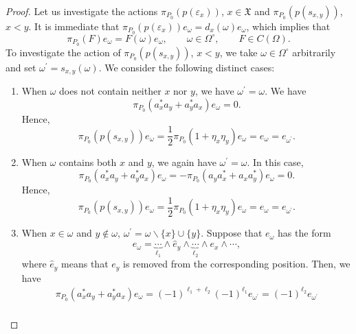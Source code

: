 \documentclass[pdftex]{sigma}
\numberwithin{equation}{section}
\newcommand{\pr}[1]{#1^{\prime}}
\newcommand{\mfrak}[1]{\mathfrak{#1}}
\begin{document}
\begin{proof}
Let us investigate the actions $\pi_{P_{0}}(p(\varepsilon_{x}))$, $x\in\mfrak{X}$ and $\pi_{P_{0}}(p(s_{x,y}))$, $x<y$. It is immediate that
$\pi_{P_{0}}(p(\varepsilon_{x}))e_{\omega}=d_{x}(\omega) e_{\omega}$,
which implies that
\begin{equation*}
	\pi_{P_{0}}(F)e_{\omega}=F(\omega) e_{\omega},\qquad \omega\in \Omega^{\circ},\qquad F\in C(\Omega).
\end{equation*}
To investigate the action of $\pi_{P_{0}}(p(s_{x,y}))$, $x<y$, we take $\omega\in \Omega^{\circ}$ arbitrarily and set $\pr{\omega}=s_{x,y}(\omega)$.
We consider the following distinct cases:
\begin{enumerate}\itemsep=0pt\samepage
\item 	When $\omega$ does not contain neither $x$ nor $y$, we have $\pr{\omega}=\omega$.
We have
				\begin{equation*}
					\pi_{P_{0}}(a_{x}^{\ast}a_{y}+a_{y}^{\ast}a_{x})e_{\omega}=0.
				\end{equation*}
				Hence,
				\begin{equation*}
\pi_{P_{0}}(p(s_{x,y}))e_{\omega}=\frac{1}{2}\pi_{P_{0}}(1+\eta_{x}\eta_{y})e_{\omega}=e_{\omega}=e_{\pr{\omega}}.
				\end{equation*}
\item 	When $\omega$ contains both $x$ and $y$, we again have $\pr{\omega}=\omega$. In this case,
				\begin{equation*}
\pi_{P_{0}}(a_{x}^{\ast}a_{y}+a_{y}^{\ast}a_{x})e_{\omega}=-\pi_{P_{0}}(a_{y}a_{x}^{\ast}+a_{x}a_{y}^{\ast})e_{\omega}=0.
				\end{equation*}
				Hence,
				\begin{equation*}
\pi_{P_{0}}(p(s_{x,y}))e_{\omega}=\frac{1}{2}\pi_{P_{0}}(1+\eta_{x}\eta_{y})e_{\omega}=e_{\omega}=e_{\pr{\omega}}.
				\end{equation*}
		\item 	When $x\in\omega$ and $y\not\in\omega$, $\pr{\omega}=\omega\backslash \{x\}\cup \{y\}$.
				Suppose that $e_{\omega}$ has the form
				\begin{equation*}
e_{\omega}=\underbrace{\cdots}_{\ell_{1}} \wedge \hat{e}_{y} \wedge\underbrace{\cdots}_{\ell_{2}} \wedge e_{x}\wedge\cdots,
				\end{equation*}
				where $\hat{e}_{y}$ means that $e_{y}$ is removed from the corresponding position.
				Then, we have
				\begin{gather*}
\pi_{P_{0}}(a^{\ast}_{x}a_{y}+a_{y}^{\ast}a_{x})e_{\omega}=(-1)^{\ell_{1}+\ell_{2}}(-1)^{\ell_{1}}e_{\pr{\omega}}=(-1)^{\ell_{2}}e_{\pr{\omega}} \\

\end{gather*}
\end{enumerate}
\end{proof}
\end{document}
